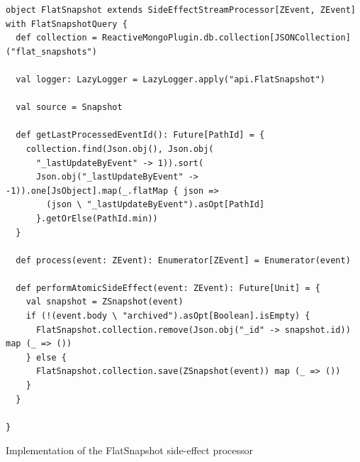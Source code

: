 \begin{listing}[h]
\begin{verbatim}
object FlatSnapshot extends SideEffectStreamProcessor[ZEvent, ZEvent] with FlatSnapshotQuery {
  def collection = ReactiveMongoPlugin.db.collection[JSONCollection]("flat_snapshots")

  val logger: LazyLogger = LazyLogger.apply("api.FlatSnapshot")
  
  val source = Snapshot
  
  def getLastProcessedEventId(): Future[PathId] = {
    collection.find(Json.obj(), Json.obj(
      "_lastUpdateByEvent" -> 1)).sort(
      Json.obj("_lastUpdateByEvent" -> -1)).one[JsObject].map(_.flatMap { json =>
        (json \ "_lastUpdateByEvent").asOpt[PathId]
      }.getOrElse(PathId.min))
  }
  
  def process(event: ZEvent): Enumerator[ZEvent] = Enumerator(event)
  
  def performAtomicSideEffect(event: ZEvent): Future[Unit] = {
    val snapshot = ZSnapshot(event)
    if (!(event.body \ "archived").asOpt[Boolean].isEmpty) {
      FlatSnapshot.collection.remove(Json.obj("_id" -> snapshot.id)) map (_ => ())
    } else {
      FlatSnapshot.collection.save(ZSnapshot(event)) map (_ => ())
    }
  }

}
\end{verbatim}
\caption{Implementation of the FlatSnapshot side-effect processor}
\label{lst:exampleappimpl}
\end{listing}




